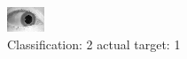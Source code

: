 \begin{figure}[h!]
\begin{center}
\includegraphics[width=0.60\columnwidth]{figures/ID1537_class_2_target_1.png}
\end{center}
\caption{ Classification: 2 actual target: 1}
\label{fig:ID1537_class_2_target_1}
\end{figure}

